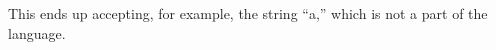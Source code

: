 \documentclass[10pt,letter]{article}
\begin{document}
This ends up accepting, for example, the string ``a,'' which is not a part of the language.








\end{document}
